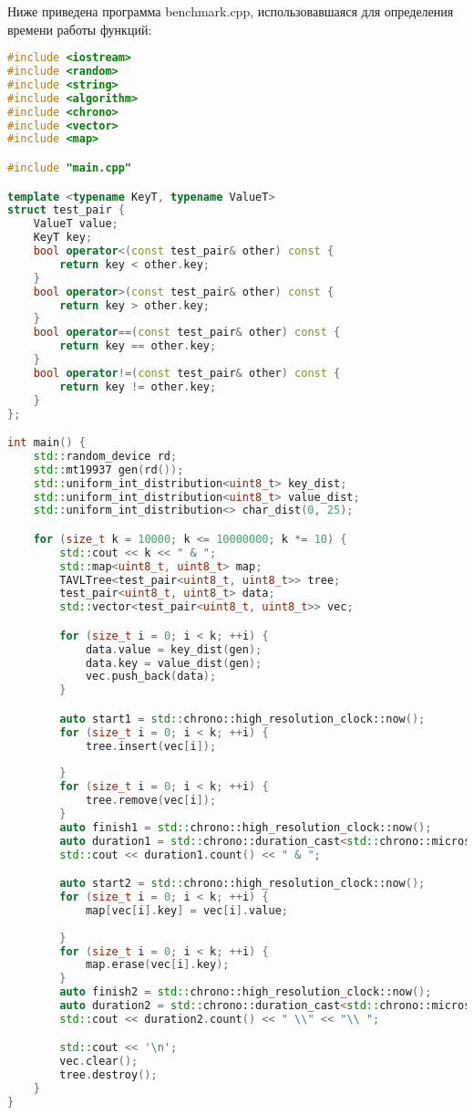 \documentclass[12pt]{article}
\begin{document}
Ниже приведена программа benchmark.cpp, использовавшаяся для определения времени работы функций:
\begin{lstlisting}[language=C++]
#include <iostream>
#include <random>
#include <string>
#include <algorithm>
#include <chrono>
#include <vector>
#include <map>

#include "main.cpp"

template <typename KeyT, typename ValueT>
struct test_pair {
    ValueT value;
    KeyT key;
    bool operator<(const test_pair& other) const {
        return key < other.key;
    }
    bool operator>(const test_pair& other) const {
        return key > other.key;
    }
    bool operator==(const test_pair& other) const {
        return key == other.key;
    }
    bool operator!=(const test_pair& other) const {
        return key != other.key;
    }
};

int main() {
    std::random_device rd;
    std::mt19937 gen(rd());
    std::uniform_int_distribution<uint8_t> key_dist;
    std::uniform_int_distribution<uint8_t> value_dist;
    std::uniform_int_distribution<> char_dist(0, 25);

    for (size_t k = 10000; k <= 10000000; k *= 10) {
        std::cout << k << " & ";
        std::map<uint8_t, uint8_t> map;
        TAVLTree<test_pair<uint8_t, uint8_t>> tree;
        test_pair<uint8_t, uint8_t> data;
        std::vector<test_pair<uint8_t, uint8_t>> vec;

        for (size_t i = 0; i < k; ++i) {
            data.value = key_dist(gen);
            data.key = value_dist(gen);
            vec.push_back(data);
        }

        auto start1 = std::chrono::high_resolution_clock::now();
        for (size_t i = 0; i < k; ++i) {
            tree.insert(vec[i]);
            
        }
        for (size_t i = 0; i < k; ++i) {
            tree.remove(vec[i]);    
        }
        auto finish1 = std::chrono::high_resolution_clock::now();
        auto duration1 = std::chrono::duration_cast<std::chrono::microseconds>(finish1 - start1);
        std::cout << duration1.count() << " & ";

        auto start2 = std::chrono::high_resolution_clock::now();
        for (size_t i = 0; i < k; ++i) {
            map[vec[i].key] = vec[i].value;
            
        }
        for (size_t i = 0; i < k; ++i) {
            map.erase(vec[i].key);  
        }
        auto finish2 = std::chrono::high_resolution_clock::now();
        auto duration2 = std::chrono::duration_cast<std::chrono::microseconds>(finish2 - start2);
        std::cout << duration2.count() << " \\" << "\\ ";

        std::cout << '\n';
        vec.clear();
        tree.destroy();
    }
}


\end{lstlisting}
\end{document}
